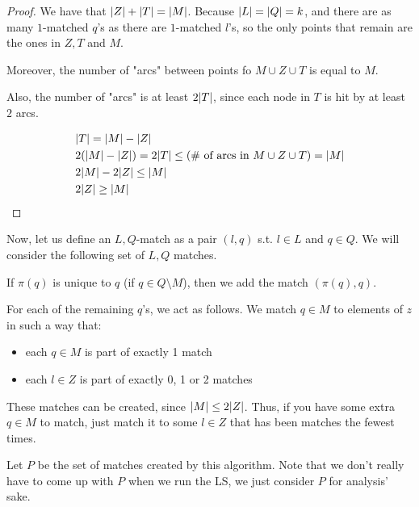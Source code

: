     \begin{proof}
        We have that $\vert Z \vert + \vert T \vert = \vert M \vert$.
        Because $\vert L \vert = \vert Q \vert = k$, and there are as many $1$-matched $q$'s as there are $1$-matched $l$'s, so the only points that remain are the ones in $Z, T$ and $M$.

        Moreover, the number of "arcs" between points fo $M \cup Z \cup T$ is equal to $M$.

        Also, the number of "arcs" is at least $2 \vert T \vert$, since each node in $T$ is hit by at least $2$ arcs.

        \begin{equation*}
            \begin{split}
                &\vert T \vert = \vert M \vert - \vert Z \vert\\
                &2 (\vert M \vert - \vert Z \vert) = 2 \vert T \vert \leq (\text{\# of arcs in } M \cup Z \cup T) = \vert M \vert\\
                &2 \vert M \vert - 2 \vert Z \vert \leq \vert M \vert\\
                &2 \vert Z \vert \geq \vert M \vert
            \end{split}
        \end{equation*}
    \end{proof}

    Now, let us define an $L,Q$-match as a pair $(l,q)$ s.t. $l \in L$ and $q \in Q$.
    We will consider the following set of $L,Q$ matches.

    If $\pi(q)$ is unique to $q$ (if $q \in Q \setminus M$), then we add the match $(\pi(q), q)$.

    For each of the remaining $q$'s, we act as follows.
    We match $q \in M$ to elements of $z$ in such a way that:
    \begin{itemize}
        \item each $q \in M$ is part of exactly 1 match
        \item each $l \in Z$ is part of exactly 0, 1 or 2 matches
    \end{itemize}

    These matches can be created, since $\vert M \vert \leq 2 \vert Z \vert$.
    Thus, if you have some extra $q \in M$ to match, just match it to some $l \in Z$ that has been matches the fewest times.

    Let $P$ be the set of matches created by this algorithm.
    Note that we don't really have to come up with $P$ when we run the LS, we just consider $P$ for analysis' sake.

